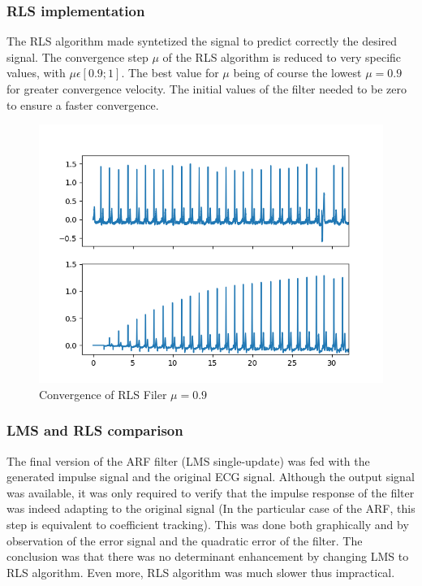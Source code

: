 \documentclass[conference]{IEEEtran}
\begin{document}
\subsubsection{RLS implementation}
The RLS algorithm made syntetized the signal to predict correctly the desired signal.
The convergence step $\mu$ of the RLS algorithm is reduced to very specific values, with $\mu \epsilon [0.9; 1]$. The best value for $\mu$ being of course the lowest $\mu = 0.9$ for greater convergence velocity. The initial values of the filter needed to be zero to ensure a faster convergence. 
\begin{figure}[H]
\centerline{\includegraphics[scale=0.6]{imagenes/RLS_filter.png}}
\caption{Convergence of RLS Filer $\mu=0.9$}
\label{fig}
\end{figure}

\subsubsection{LMS and RLS comparison} 

The final version of the ARF filter (LMS single-update) was fed with the generated impulse signal and the original ECG signal. Although the output signal was available, it was only required to verify that the impulse response of the filter was indeed adapting to the original signal (In the particular case of the ARF, this step is equivalent to coefficient tracking). This was done both graphically and by observation of the error signal and the quadratic error of the filter. The conclusion was that there was no determinant enhancement by changing LMS to RLS algorithm. Even more, RLS algorithm was much slower thus impractical. \par
\end{document}
